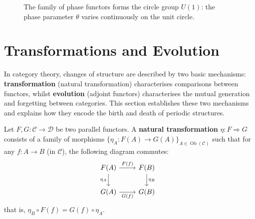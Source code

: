 \begin{figure}[htbp]
\centering
{}
\caption{The family of phase functors forms the circle group $U(1)$: the phase parameter $\theta$ varies continuously on the unit circle.}
\label{fig:phase_functor_U1}
\end{figure}

\section{Transformations and Evolution}\label{sec:transformation_evolution}

In category theory, changes of structure are described by two basic mechanisms: \textbf{transformation} (natural transformation) characterises comparisons between functors, whilst \textbf{evolution} (adjoint functors) characterises the mutual generation and forgetting between categories. This section establishes these two mechanisms and explains how they encode the birth and death of periodic structures.

\begin{definition}\label{def:natural_transformation}
Let $F, G: \mathcal{C} \to \mathcal{D}$ be two parallel functors. A \textbf{natural transformation} $\eta: F \Rightarrow G$ consists of a family of morphisms $\{\eta_A: F(A) \to G(A)\}_{A \in \operatorname{Ob}(\mathcal{C})}$ such that for any $f: A \to B$ (in $\mathcal{C}$), the following diagram commutes:
\[
\begin{tikzcd}
F(A) \arrow[r, "F(f)"] \arrow[d, "\eta_A"'] & F(B) \arrow[d, "\eta_B"] \\
G(A) \arrow[r, "G(f)"'] & G(B)
\end{tikzcd}
\]
that is, $\eta_B \circ F(f) = G(f) \circ \eta_A$.
\end{definition}

